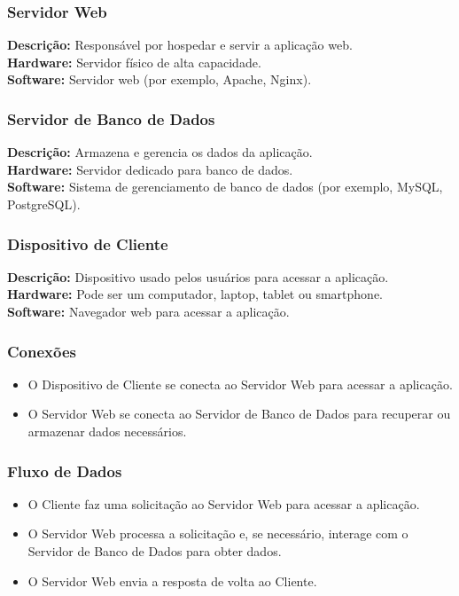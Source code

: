 \subsubsection{Servidor Web}

\textbf{Descrição:} Responsável por hospedar e servir a aplicação web. \\
\textbf{Hardware:} Servidor físico de alta capacidade. \\
\textbf{Software:} Servidor web (por exemplo, Apache, Nginx).

\subsubsection{Servidor de Banco de Dados}

\textbf{Descrição:} Armazena e gerencia os dados da aplicação. \\
\textbf{Hardware:} Servidor dedicado para banco de dados. \\
\textbf{Software:} Sistema de gerenciamento de banco de dados (por exemplo, MySQL, PostgreSQL).

\subsubsection{Dispositivo de Cliente}

\textbf{Descrição:} Dispositivo usado pelos usuários para acessar a aplicação. \\
\textbf{Hardware:} Pode ser um computador, laptop, tablet ou smartphone. \\
\textbf{Software:} Navegador web para acessar a aplicação.

\subsubsection{Conexões}

\begin{itemize}
	\item O Dispositivo de Cliente se conecta ao Servidor Web para acessar a aplicação.
	\item O Servidor Web se conecta ao Servidor de Banco de Dados para recuperar ou armazenar dados necessários.
\end{itemize}

\subsubsection{Fluxo de Dados}

\begin{itemize}
	\item O Cliente faz uma solicitação ao Servidor Web para acessar a aplicação.
	\item O Servidor Web processa a solicitação e, se necessário, interage com o Servidor de Banco de Dados para obter dados.
	\item O Servidor Web envia a resposta de volta ao Cliente.
\end{itemize}

